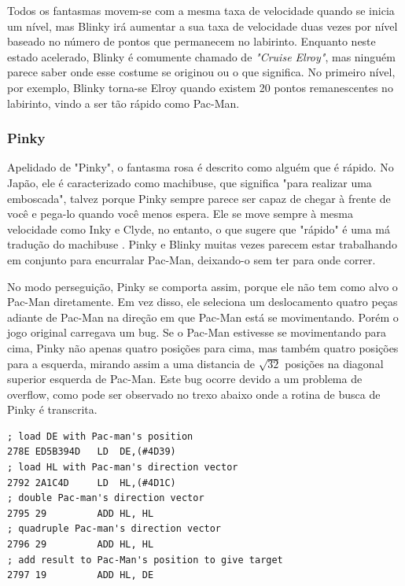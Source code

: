 \begin{multicols}{2}
Todos os fantasmas movem-se com a mesma taxa de velocidade quando se inicia um nível, mas Blinky irá aumentar a sua taxa de velocidade duas vezes por nível baseado no número de pontos que permanecem no labirinto. Enquanto neste estado acelerado, Blinky é comumente chamado de \textit{"Cruise Elroy"}, mas ninguém parece saber onde esse costume se originou ou o que significa. No primeiro nível, por exemplo, Blinky torna-se Elroy quando existem 20 pontos remanescentes no labirinto, vindo a ser tão rápido como Pac-Man.\cite{dossier}

\subsubsection{Pinky}\label{pinky}

Apelidado de "Pinky", o fantasma rosa é descrito como alguém que é rápido. No Japão, ele é caracterizado como machibuse, que significa "para realizar uma emboscada", talvez porque Pinky sempre parece ser capaz de chegar à frente de você e pega-lo quando você menos espera. Ele se move sempre à mesma velocidade como Inky e Clyde, no entanto, o que sugere que "rápido" é uma má tradução do machibuse . Pinky e Blinky muitas vezes parecem estar trabalhando em conjunto para encurralar Pac-Man, deixando-o sem ter para onde correr.\cite{dossier}

No modo perseguição, Pinky se comporta assim, porque ele não tem como alvo o Pac-Man diretamente. Em vez disso, ele seleciona um deslocamento quatro peças adiante de Pac-Man na direção em que Pac-Man está se movimentando. Porém o jogo original carregava um bug. Se o Pac-Man estivesse se movimentando para cima, Pinky não apenas quatro posições para cima, mas também quatro posições para a esquerda, mirando assim a uma distancia de $\sqrt{32}$ posições na diagonal superior esquerda de Pac-Man. Este bug ocorre devido a um problema de overflow, como pode ser observado no trexo abaixo onde a rotina de  busca de Pinky é transcrita.

\begin{lstlisting}[language=MSP430,title=\textit{Subrotina de alvo de Pinky \cite{pinkybug}},numbers=none]
; load DE with Pac-man's position
278E ED5B394D 	LD  DE,(#4D39) 	
; load HL with Pac-man's direction vector
2792 2A1C4D 	LD  HL,(#4D1C)	
; double Pac-man's direction vector
2795 29 		ADD HL, HL		
; quadruple Pac-man's direction vector
2796 29 		ADD HL, HL		
; add result to Pac-Man's position to give target
2797 19 		ADD HL, DE 		
\end{lstlisting}


\end{multicols}
